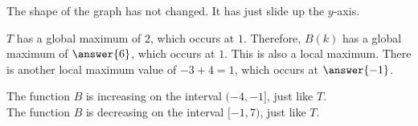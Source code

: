 \documentclass{ximera}
\begin{document}
The shape of the graph has not changed.  It has just slide up the $y$-axis.






$T$ has a global maximum of $2$, which occurs at $1$.  Therefore, $B(k)$ has a global maximum of $\answer{6}$, which occurs at $1$.  This is also a local maximum.  There is another local maximum value of $-3+4=1$, which occurs at $\answer{-1}$.

The function $B$ is increasing on the interval $(-4,-1]$, just like $T$. \\
The function $B$ is decreasing on the interval $[-1, 7)$, just like $T$.
\end{document}
